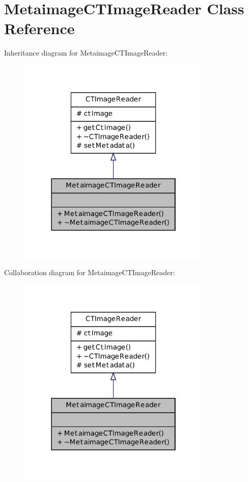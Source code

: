 \hypertarget{class_metaimage_c_t_image_reader}{
\section{MetaimageCTImageReader Class Reference}
\label{class_metaimage_c_t_image_reader}
}


Inheritance diagram for MetaimageCTImageReader:
\nopagebreak
\begin{figure}[H]
\begin{center}
\leavevmode
\includegraphics[width=262pt]{class_metaimage_c_t_image_reader__inherit__graph}
\end{center}
\end{figure}


Collaboration diagram for MetaimageCTImageReader:
\nopagebreak
\begin{figure}[H]
\begin{center}
\leavevmode
\includegraphics[width=262pt]{class_metaimage_c_t_image_reader__coll__graph}
\end{center}
\end{figure}
